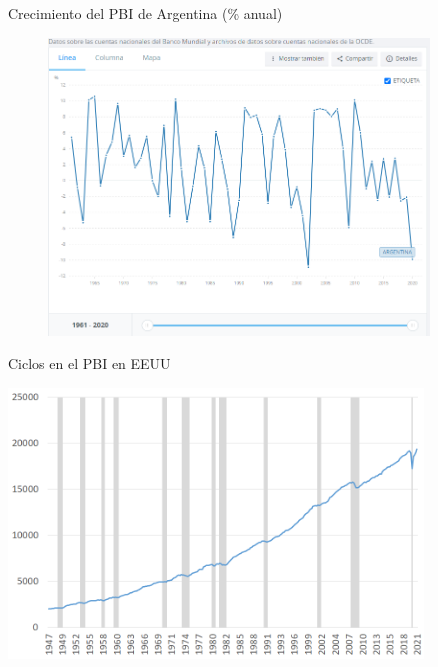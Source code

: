 \documentclass{beamer}
\begin{document}
\begin{frame}{Crecimiento del PBI de Argentina (\% anual)}
    \begin{figure}[htp]
\href{https://datos.bancomundial.org/share/widget?indicators=NY.GDP.MKTP.KD.ZG&locations=AR" width='450' height='300' frameBorder='0' scrolling="no"} {\includegraphics[width=0.90\textwidth]{Figures/PBIargentina.png}} 
\end{figure}
\end{frame}

\begin{frame}{Ciclos en el PBI en EEUU}

\centering\includegraphics[width=11cm]{USA_Rec.png}\

\end{frame}
\end{document}
